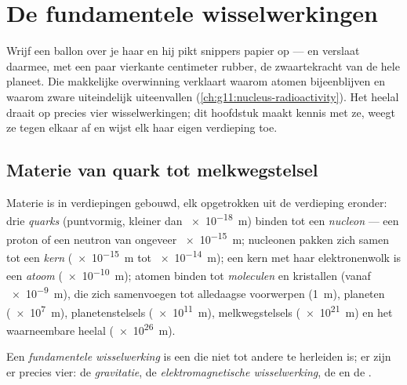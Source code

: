 \chapter{De fundamentele wisselwerkingen}\label{ch:g11:fundamental-interactions}

Wrijf een ballon over je haar en hij pikt snippers papier op --- en
verslaat daarmee, met een paar vierkante centimeter rubber, de
zwaartekracht van de hele planeet. Die makkelijke overwinning verklaart
waarom atomen bijeenblijven en waarom zware  uiteindelijk
uiteenvallen (\cref{ch:g11:nucleus-radioactivity}). Het heelal draait op
precies vier wisselwerkingen; dit hoofdstuk maakt kennis met ze, weegt ze
tegen elkaar af en wijst elk haar eigen verdieping toe.

\section{Materie van quark tot melkwegstelsel}

\begin{definition}\label{def:g11:fundamental-interactions:ladder}
Materie is in verdiepingen gebouwd, elk opgetrokken uit de verdieping
eronder: drie \emph{quarks} (puntvormig, kleiner dan
\qty{e-18}{m}) binden tot een \emph{nucleon} --- een
proton of een neutron van ongeveer \qty{e-15}{m}; nucleonen pakken zich
samen tot een \emph{kern} (\qty{e-15}{m} tot \qty{e-14}{m});
een kern met haar elektronenwolk is een \emph{atoom}
(\qty{e-10}{m}); atomen binden tot \emph{moleculen} en
kristallen (vanaf \qty{e-9}{m}), die zich samenvoegen tot alledaagse
voorwerpen (\qty{1}{m}), planeten (\qty{e7}{m}), planetenstelsels
(\qty{e11}{m}), melkwegstelsels (\qty{e21}{m}) en het waarneembare
heelal (\qty{e26}{m}).
\end{definition}

\begin{definition}\label{def:g11:fundamental-interactions:four}
Een \emph{fundamentele wisselwerking}
is een  die niet tot andere  te herleiden is; er zijn er
precies vier: de \emph{gravitatie}, de
\emph{elektromagnetische wisselwerking}, de  en de .
\end{definition}

